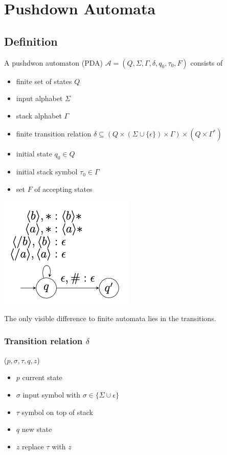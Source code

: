 \documentclass[a3paper, 8pt]{extarticle}
\begin{document}
\begin{multicols*}{6}
\begin{enumerate}
\end{enumerate}

\section{Pushdown Automata} 

\subsection{Definition}
A pushdwon automaton (PDA) $\mathcal{A}=(Q,\Sigma,\Gamma, \delta, q_0, \tau_0, F)$ consists of \begin{itemize}
    \item finite set of states $Q$
    \item input alphabet $\Sigma$
    \item stack alphabet $\Gamma$
    \item finite transition relation $\delta \subseteq (Q \times (\Sigma \cup \{\epsilon\}) \times \Gamma) \times (Q \times \Gamma^*)$
    \item initial state $q_0 \in Q$
    \item initial stack symbol $\tau_0 \in \Gamma$
    \item set $F$ of accepting states
\end{itemize}

\begin{center}
    \includegraphics[width=0.45\columnwidth]{images/Screen Shot 2022-12-26 at 15.58.02.png}
\end{center}

The only visible difference to finite automata lies in the transitions. 
\subsubsection{Transition relation $\delta$} ($p, \sigma, \tau, q, z$) \begin{itemize}
    \item $p$ current state
    \item $\sigma$ input symbol with $\sigma \in \{\Sigma \cup \epsilon\}$
    \item $\tau$ symbol on top of stack
    \item $q$ new state
    \item $z$ replace $\tau$ with $z$
\end{itemize}


\end{multicols*}
\end{document}
